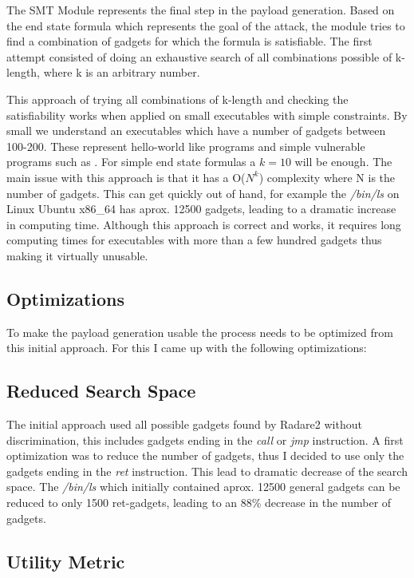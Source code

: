 The SMT Module represents the final step in the payload generation. Based on the end state formula which represents the goal of the attack, the module tries to find a combination of gadgets for which the formula is satisfiable. The first attempt consisted of doing an exhaustive search of all combinations possible of k-length, where k is an arbitrary number.

This approach of trying all combinations of k-length and checking the satisfiability works when applied on small executables with simple constraints. By small we understand an executables which have a number of gadgets between 100-200. These represent hello-world like programs and simple vulnerable programs such as . For simple end state formulas a ${k = 10}$ will be enough. The main issue with this approach is that it has a O(${N^k}$) complexity where N is the number of gadgets. This can get quickly out of hand, for example the \textit{/bin/ls} on Linux Ubuntu x86_64 has aprox. 12500 gadgets, leading to a dramatic increase in computing time. Although this approach is correct and works, it requires long computing times for executables with more than a few hundred gadgets thus making it virtually unusable.

\subsection{Optimizations}

To make the payload generation usable the process needs to be optimized from this initial approach. For this I came up with the following optimizations:

\subsection{Reduced Search Space}

The initial approach used all possible gadgets found by Radare2 without discrimination, this includes gadgets ending in the \textit{call} or \textit{jmp} instruction. A first optimization was to reduce the number of gadgets, thus I decided to use only the gadgets ending in the \textit{ret} instruction. This lead to dramatic decrease of the search space. The \textit{/bin/ls} which initially contained aprox. 12500 general gadgets can be reduced to only 1500 ret-gadgets, leading to an 88\% decrease in the number of gadgets.

\subsection{Utility Metric}

